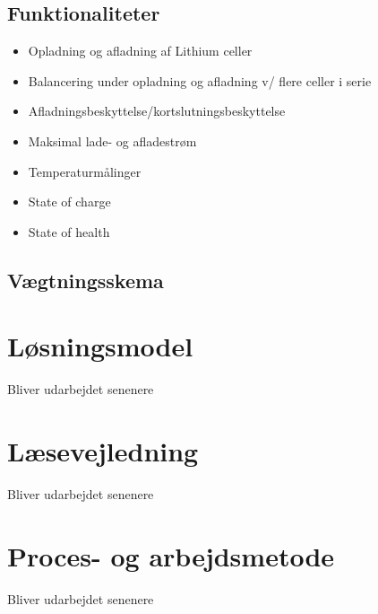 \subsection{Funktionaliteter}

\begin{itemize}
	\item Opladning og afladning af Lithium celler
	\item Balancering under opladning og afladning v/ flere celler i serie
	\item Afladningsbeskyttelse/kortslutningsbeskyttelse
	\item Maksimal lade- og afladestrøm
	\item Temperaturmålinger
	\item State of charge
	\item State of health
\end{itemize}

\subsection{Vægtningsskema}

\section{Løsningsmodel}
Bliver udarbejdet senenere

\section{Læsevejledning}
Bliver udarbejdet senenere

\section{Proces- og arbejdsmetode}
Bliver udarbejdet senenere
